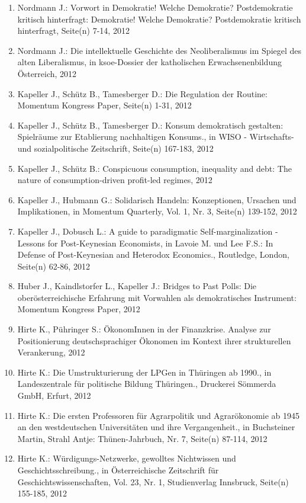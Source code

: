 \begin{enumerate}
	 \item Nordmann J.: Vorwort in \glqq Demokratie! Welche Demokratie? Postdemokratie kritisch hinterfragt\grqq{}: Demokratie! Welche Demokratie? Postdemokratie kritisch hinterfragt, Seite(n) 7-14, 2012
	 \item Nordmann J.: Die intellektuelle Geschichte des Neoliberalismus im Spiegel des alten Liberalismus, in ksoe-Dossier der katholischen Erwachsenenbildung Österreich, 2012
	 \item Kapeller J., Schütz B., Tamesberger D.: Die Regulation der Routine: Momentum Kongress Paper, Seite(n) 1-31, 2012
	 \item Kapeller J., Schütz B., Tamesberger D.: Konsum demokratisch gestalten: Spielräume zur Etablierung nachhaltigen Konsums., in WISO - Wirtschafts- und sozialpolitische Zeitschrift, Seite(n) 167-183, 2012
	 \item Kapeller J., Schütz B.: Conspicuous consumption, inequality and debt: The nature of consumption-driven profit-led regimes, 2012
	 \item Kapeller J., Hubmann G.: Solidarisch Handeln: Konzeptionen, Ursachen und Implikationen, in Momentum Quarterly, Vol. 1, Nr. 3, Seite(n) 139-152, 2012
	 \item Kapeller J., Dobusch L.: A guide to paradigmatic Self-marginalization - Lessons for Post-Keynesian Economists, in Lavoie M. und Lee F.S.: In Defense of Post-Keynesian and Heterodox Economics., Routledge, London, Seite(n) 62-86, 2012
	 \item Huber J., Kaindlstorfer L., Kapeller J.: Bridges to Past Polls: Die oberösterreichische Erfahrung mit Vorwahlen als demokratisches Instrument: Momentum Kongress Paper, 2012
	 \item Hirte K., Pühringer S.: ÖkonomInnen in der Finanzkrise. Analyse zur Positionierung deutschsprachiger Ökonomen im Kontext ihrer strukturellen Verankerung, 2012
	 \item Hirte K.: Die Umstrukturierung der LPGen in Thüringen ab 1990., in Landeszentrale für politische Bildung Thüringen., Druckerei Sömmerda GmbH, Erfurt, 2012
	 \item Hirte K.: Die ersten Professoren für Agrarpolitik und Agrarökonomie ab 1945 an den westdeutschen Universitäten und ihre Vergangenheit., in Buchsteiner Martin, Strahl Antje: Thünen-Jahrbuch, Nr. 7, Seite(n) 87-114, 2012
	 \item Hirte K.: Würdigungs-Netzwerke, gewolltes Nichtwissen und Geschichtsschreibung., in Österreichische Zeitschrift für Geschichtswissenschaften, Vol. 23, Nr. 1, Studienverlag Innsbruck, Seite(n) 155-185, 2012

\end{enumerate}
